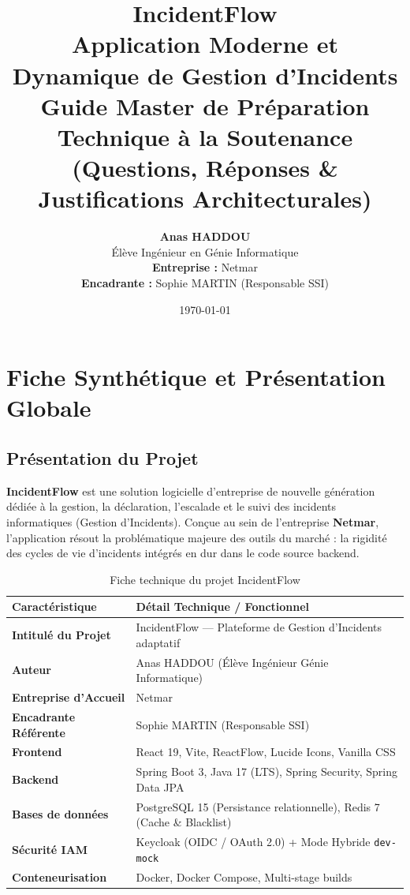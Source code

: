 \documentclass[12pt,a4paper]{article}
\title{
    \vspace{1.5cm}
    \textcolor{secondary}{\textbf{\Huge IncidentFlow}}\\[0.5cm]
    \textcolor{primary}{\Large Application Moderne et Dynamique de Gestion d'Incidents}\\[1.5cm]
    \textbf{\Large Guide Master de Préparation Technique à la Soutenance \\ (Questions, Réponses \& Justifications Architecturales)}
    \vspace{2cm}
}
\author{
    \textbf{Anas HADDOU} \\
    Élève Ingénieur en Génie Informatique \\[1cm]
    \textbf{Entreprise :} Netmar \\
    \textbf{Encadrante :} Sophie MARTIN (Responsable SSI)
}
\date{\today}
\begin{document}
\maketitle
\thispagestyle{empty}
\clearpage

\tableofcontents
\clearpage

\section{Fiche Synthétique et Présentation Globale}

\subsection{Présentation du Projet}
\textbf{IncidentFlow} est une solution logicielle d'entreprise de nouvelle génération dédiée à la gestion, la déclaration, l'escalade et le suivi des incidents informatiques (Gestion d'Incidents). Conçue au sein de l'entreprise \textbf{Netmar}, l'application résout la problématique majeure des outils du marché : la rigidité des cycles de vie d'incidents intégrés en dur dans le code source backend.

\begin{table}[h!]
\centering
\begin{tabular}{ll}
\toprule
\textbf{Caractéristique} & \textbf{Détail Technique / Fonctionnel} \\
\midrule
\textbf{Intitulé du Projet} & IncidentFlow — Plateforme de Gestion d'Incidents adaptatif \\
\textbf{Auteur} & Anas HADDOU (Élève Ingénieur Génie Informatique) \\
\textbf{Entreprise d'Accueil} & Netmar \\
\textbf{Encadrante Référente} & Sophie MARTIN (Responsable SSI) \\
\textbf{Frontend} & React 19, Vite, ReactFlow, Lucide Icons, Vanilla CSS \\
\textbf{Backend} & Spring Boot 3, Java 17 (LTS), Spring Security, Spring Data JPA \\
\textbf{Bases de données} & PostgreSQL 15 (Persistance relationnelle), Redis 7 (Cache \& Blacklist) \\
\textbf{Sécurité IAM} & Keycloak (OIDC / OAuth 2.0) + Mode Hybride \texttt{dev-mock} \\
\textbf{Conteneurisation} & Docker, Docker Compose, Multi-stage builds \\
\bottomrule
\end{tabular}
\caption{Fiche technique du projet IncidentFlow}
\end{table}
\end{document}

